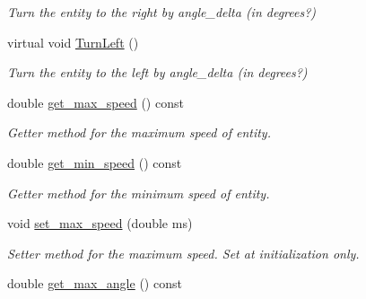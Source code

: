 \begin{DoxyCompactItemize}
\begin{DoxyCompactList}\small\item\em Turn the entity to the right by angle\+\_\+delta (in degrees?) \end{DoxyCompactList}\item 
virtual void \hyperlink{classMotionHandler_a922e3dd8c6a98b54607837c5e669c557}{Turn\+Left} ()\hypertarget{classMotionHandler_a922e3dd8c6a98b54607837c5e669c557}{}\label{classMotionHandler_a922e3dd8c6a98b54607837c5e669c557}

\begin{DoxyCompactList}\small\item\em Turn the entity to the left by angle\+\_\+delta (in degrees?) \end{DoxyCompactList}\item 
double \hyperlink{classMotionHandler_a4024f3b5562b5e49bfaeab9f82c0762b}{get\+\_\+max\+\_\+speed} () const \hypertarget{classMotionHandler_a4024f3b5562b5e49bfaeab9f82c0762b}{}\label{classMotionHandler_a4024f3b5562b5e49bfaeab9f82c0762b}

\begin{DoxyCompactList}\small\item\em Getter method for the maximum speed of entity. \end{DoxyCompactList}\item 
double \hyperlink{classMotionHandler_a79f91588f2b5b4b17dcbb5e09bf88d64}{get\+\_\+min\+\_\+speed} () const \hypertarget{classMotionHandler_a79f91588f2b5b4b17dcbb5e09bf88d64}{}\label{classMotionHandler_a79f91588f2b5b4b17dcbb5e09bf88d64}

\begin{DoxyCompactList}\small\item\em Getter method for the minimum speed of entity. \end{DoxyCompactList}\item 
void \hyperlink{classMotionHandler_a32e832d35e73e9db85c16b3ff569196e}{set\+\_\+max\+\_\+speed} (double ms)\hypertarget{classMotionHandler_a32e832d35e73e9db85c16b3ff569196e}{}\label{classMotionHandler_a32e832d35e73e9db85c16b3ff569196e}

\begin{DoxyCompactList}\small\item\em Setter method for the maximum speed. Set at initialization only. \end{DoxyCompactList}\item 
double \hyperlink{classMotionHandler_a55eb7aeb355b6ee86b2bd8751fde6cb5}{get\+\_\+max\+\_\+angle} () const \hypertarget{classMotionHandler_a55eb7aeb355b6ee86b2bd8751fde6cb5}{}\label{classMotionHandler_a55eb7aeb355b6ee86b2bd8751fde6cb5}


\end{DoxyCompactItemize}
